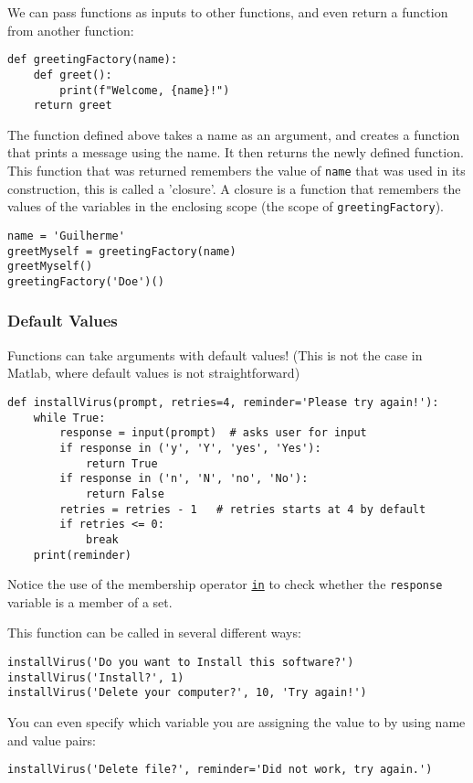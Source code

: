 \documentclass[12pt, a4paper]{article}
\begin{document}
We can pass functions as inputs to other functions, and even return a function from another function:
\lstset{language=jupyter-python,label= ,caption= ,captionpos=b,numbers=none}
\begin{lstlisting}
def greetingFactory(name):
    def greet():
        print(f"Welcome, {name}!")
    return greet
\end{lstlisting}

The function defined above takes a name as an argument, and creates a function that prints a message using the name.
It then returns the newly defined function.
This function that was returned remembers the value of \texttt{name} that was used in its construction, this is called a 'closure'.
A closure is a function that remembers the values of the variables in the enclosing scope (the scope of \texttt{greetingFactory}).
\lstset{language=jupyter-python,label= ,caption= ,captionpos=b,numbers=none}
\begin{lstlisting}
name = 'Guilherme'
greetMyself = greetingFactory(name)
greetMyself()
greetingFactory('Doe')()
\end{lstlisting}
\subsubsection{Default Values}
\label{sec:org81a5f3e}
Functions can take arguments with default values! (This is not the case in Matlab, where default values is not straightforward)
\lstset{language=jupyter-python,label= ,caption= ,captionpos=b,numbers=none}
\begin{lstlisting}
def installVirus(prompt, retries=4, reminder='Please try again!'):
    while True:
        response = input(prompt)  # asks user for input
        if response in ('y', 'Y', 'yes', 'Yes'):
            return True
        if response in ('n', 'N', 'no', 'No'):
            return False
        retries = retries - 1   # retries starts at 4 by default
        if retries <= 0:
            break
    print(reminder)
\end{lstlisting}
Notice the use of the membership operator \href{https://docs.python.org/3.6/reference/expressions.html\#membership-test-operations}{\texttt{in}} to check whether the \texttt{response} variable is a member of a set.

This function can be called in several different ways:
\lstset{language=jupyter-python,label= ,caption= ,captionpos=b,numbers=none}
\begin{lstlisting}
installVirus('Do you want to Install this software?')
installVirus('Install?', 1)
installVirus('Delete your computer?', 10, 'Try again!')
\end{lstlisting}
You can even specify which variable you are assigning the value to by using name and value pairs:
\lstset{language=jupyter-python,label= ,caption= ,captionpos=b,numbers=none}
\begin{lstlisting}
installVirus('Delete file?', reminder='Did not work, try again.')
\end{lstlisting}
\end{document}
